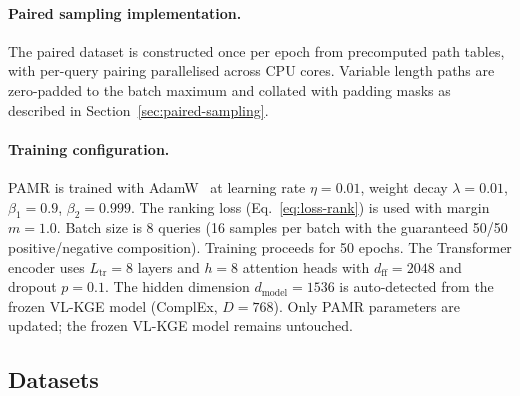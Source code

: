 \documentclass[runningheads]{llncs}
\begin{document}
\paragraph{Paired sampling implementation.}
The paired dataset is constructed once per epoch from precomputed
path tables, with per-query pairing parallelised across CPU cores.
Variable length paths are zero-padded to the batch maximum and
collated with padding masks as described in
Section~\ref{sec:paired-sampling}.

\paragraph{Training configuration.}
PAMR is trained with AdamW~\cite{loshchilov2019decoupled} at learning
rate $\eta = 0.01$, weight decay $\lambda = 0.01$, $\beta_1 = 0.9$,
$\beta_2 = 0.999$. The ranking loss (Eq.~\ref{eq:loss-rank}) is
used with margin $m = 1.0$. Batch size is 8 queries (16 samples per
batch with the guaranteed 50/50 positive/negative composition).
Training proceeds for 50 epochs. The Transformer encoder uses
$L_{\text{tr}} = 8$ layers and $h = 8$ attention heads with
$d_{\text{ff}} = 2048$ and dropout $p = 0.1$. The hidden dimension
$d_{\text{model}} = 1536$ is auto-detected from the frozen VL-KGE
model (ComplEx, $D = 768$). Only PAMR parameters are updated; the
frozen VL-KGE model remains untouched.

\subsection{Datasets}
\label{sec:datasets}
\end{document}
